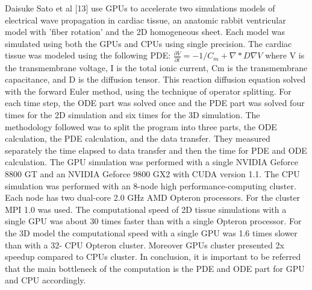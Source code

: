 Daisuke Sato et al [13] use GPUs to accelerate two simulations models of electrical wave propagation in cardiac tissue, an anatomic rabbit ventricular model with 'fiber rotation' and the 2D homogeneous sheet. Each model was simulated using both the GPUs and CPUs using single precision. The cardiac tissue was modeled using the following PDE: 
$\frac{\partial V}{\partial t} = - 1/C_m  +\nabla * D \nabla V$ where V is the transmembrane voltage, I is the total ionic current, Cm is the transmembrane capacitance, and D is the diffusion tensor. This reaction diffusion equation solved with the forward Euler method, using the technique of operator splitting. For each time step, the ODE part was solved once and the PDE part was solved four times for the 2D simulation and six times for the 3D simulation. The methodology followed was to split the program into three parts, the ODE calculation, the PDE calculation, and the data transfer. They measured separately the time elapsed to data transfer and then the time for PDE and ODE calculation. The GPU simulation was performed with a single NVIDIA Geforce 8800 GT and an NVIDIA Geforce 9800 GX2 with CUDA version 1.1. The CPU simulation was performed with an 8-node high performance-computing cluster. Each node has two dual-core 2.0 GHz AMD Opteron processors. For the cluster MPI 1.0 was used. The computational speed of 2D tissue simulations with a single GPU was about 30 times faster than with a single Opteron processor. For the 3D model the computational speed with a single GPU was 1.6 times slower than with a 32- CPU Opteron cluster. Moreover GPUs cluster presented 2x speedup compared to CPUs cluster. In conclusion, it is important to be referred that the main bottleneck of the computation is the PDE and ODE part for GPU and CPU accordingly.

